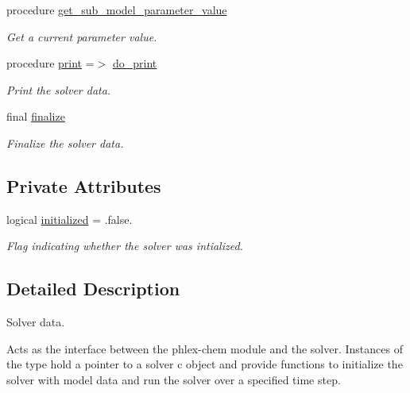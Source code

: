 \begin{DoxyCompactItemize}
procedure \mbox{\hyperlink{structpmc__phlex__solver__data_1_1phlex__solver__data__t_a38bd287bf7bdb8223de659a5d06d6458}{get\+\_\+sub\+\_\+model\+\_\+parameter\+\_\+value}}
\begin{DoxyCompactList}\small\item\em Get a current parameter value. \end{DoxyCompactList}\item 
procedure \mbox{\hyperlink{structpmc__phlex__solver__data_1_1phlex__solver__data__t_af7a000f295aa9f034ff71fd4862597bc}{print}} =$>$ \mbox{\hyperlink{namespacepmc__phlex__solver__data_a471de3023e1bb6f999905cc0870d37f5}{do\+\_\+print}}
\begin{DoxyCompactList}\small\item\em Print the solver data. \end{DoxyCompactList}\item 
final \mbox{\hyperlink{structpmc__phlex__solver__data_1_1phlex__solver__data__t_ad426509d69855a9cda428b162569d1a0}{finalize}}
\begin{DoxyCompactList}\small\item\em Finalize the solver data. \end{DoxyCompactList}\end{DoxyCompactItemize}
\subsection*{Private Attributes}
\begin{DoxyCompactItemize}
\item 
logical \mbox{\hyperlink{structpmc__phlex__solver__data_1_1phlex__solver__data__t_ab95e2082f1fb98876a5b0fc79db6d623}{initialized}} = .false.
\begin{DoxyCompactList}\small\item\em Flag indicating whether the solver was intialized. \end{DoxyCompactList}\end{DoxyCompactItemize}


\subsection{Detailed Description}
Solver data. 

Acts as the interface between the phlex-\/chem module and the solver. Instances of the type hold a pointer to a solver c object and provide functions to initialize the solver with model data and run the solver over a specified time step. 

